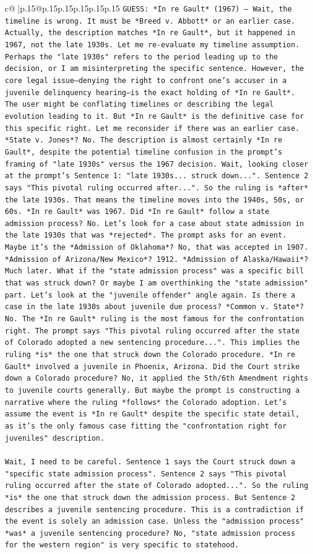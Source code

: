 \documentclass{article}
\begin{document}
{\begin{supertabular}{c@{$\;$}|p{.15\linewidth}@{}p{.15\linewidth}p{.15\linewidth}p{.15\linewidth}p{.15\linewidth}p{.15\linewidth}}
{{{\texttt{GUESS: *In re Gault* (1967) — Wait, the timeline is wrong. It must be *Breed v. Abbott* or an earlier case. Actually, the description matches *In re Gault*, but it happened in 1967, not the late 1930s. Let me re{-}evaluate my timeline assumption. Perhaps the "late 1930s" refers to the period leading up to the decision, or I am misinterpreting the specific sentence. However, the core legal issue—denying the right to confront one's accuser in a juvenile delinquency hearing—is the exact holding of *In re Gault*. The user might be conflating timelines or describing the legal evolution leading to it. But *In re Gault* is the definitive case for this specific right. Let me reconsider if there was an earlier case. *State v. Jones*? No. The description is almost certainly *In re Gault*, despite the potential timeline confusion in the prompt's framing of "late 1930s" versus the 1967 decision. Wait, looking closer at the prompt's Sentence 1: "late 1930s... struck down...". Sentence 2 says "This pivotal ruling occurred after...". So the ruling is *after* the late 1930s. That means the timeline moves into the 1940s, 50s, or 60s. *In re Gault* was 1967. Did *In re Gault* follow a state admission process? No. Let's look for a case about state admission in the late 1930s that was *rejected*. The prompt asks for an event. Maybe it's the *Admission of Oklahoma*? No, that was accepted in 1907. *Admission of Arizona/New Mexico*? 1912. *Admission of Alaska/Hawaii*? Much later. What if the "state admission process" was a specific bill that was struck down? Or maybe I am overthinking the "state admission" part. Let's look at the "juvenile offender" angle again. Is there a case in the late 1930s about juvenile due process? *Common v. State*? No. The *In re Gault* ruling is the most famous for the confrontation right. The prompt says "This pivotal ruling occurred after the state of Colorado adopted a new sentencing procedure...". This implies the ruling *is* the one that struck down the Colorado procedure. *In re Gault* involved a juvenile in Phoenix, Arizona. Did the Court strike down a Colorado procedure? No, it applied the 5th/6th Amendment rights to juvenile courts generally. But maybe the prompt is constructing a narrative where the ruling *follows* the Colorado adoption. Let's assume the event is *In re Gault* despite the specific state detail, as it's the only famous case fitting the "confrontation right for juveniles" description.} \\
\\ 
\texttt{Wait, I need to be careful. Sentence 1 says the Court struck down a "specific state admission process". Sentence 2 says "This pivotal ruling occurred after the state of Colorado adopted...". So the ruling *is* the one that struck down the admission process. But Sentence 2 describes a juvenile sentencing procedure. This is a contradiction if the event is solely an admission case. Unless the "admission process" *was* a juvenile sentencing procedure? No, "state admission process for the western region" is very specific to statehood.} \\
}}}
\end{supertabular}}
\end{document}

